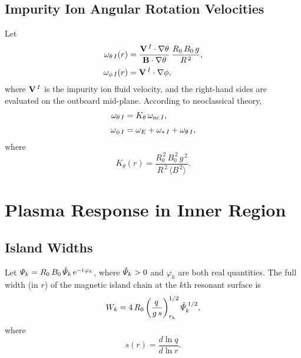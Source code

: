 \documentclass[notitlepage,12pt]{article}
\begin{document}
\subsection{Impurity Ion Angular Rotation Velocities}\label{srotation}
Let
\begin{align}
\omega_{\theta\,I}(r)&=\frac{{\bf V}^{\,I}\cdot\nabla\theta}{{\bf B}\cdot\nabla\theta}\,\frac{R_0\,B_0\,g}{R^{\,2}},\\[0.5ex]
\omega_{\phi\,I}(r) &= {\bf V}^{\,I}\cdot\nabla\phi,
\end{align}
where ${\bf V}^{\,I}$ is the impurity ion fluid velocity, and the right-hand sides are evaluated on the outboard mid-plane. According to neoclassical theory,
\begin{align}
\omega_{\theta\,I} &= K_\theta\,\omega_{{\rm nc}\,I},\\[0.5ex]
\omega_{\phi\,I} &= \omega_E+\omega_{\ast\,I} + \omega_{\theta\,I},
\end{align}
where
\begin{equation}
K_\theta(r) = \frac{R_0^{\,2}\,B_0^{\,2}\,g^{\,2}}{R^{\,2}\,\langle B^{\,2}\rangle}.
\end{equation}

\section{Plasma Response in Inner Region}
\subsection{Island Widths}
Let ${\mit\Psi}_k= R_0\,B_0\,\hat{\mit\Psi}_k\,{\rm e}^{-{\rm i}\,\varphi_k}$, where $\hat{\mit\Psi}_k>0$  and $\varphi_k$ are both real quantities.
The full width (in $r$) of the magnetic island chain at the
$k$th resonant surface is
\begin{equation}
W_k = 4\,R_0\left(\frac{q\,}{g\,s}\right)^{1/2}_{r_k}\hat{\mit\Psi}_k^{\,1/2},
\end{equation}
where 
\begin{equation}
s(r) = \frac{d\ln q}{d\ln r}.
\end{equation}
\end{document}

